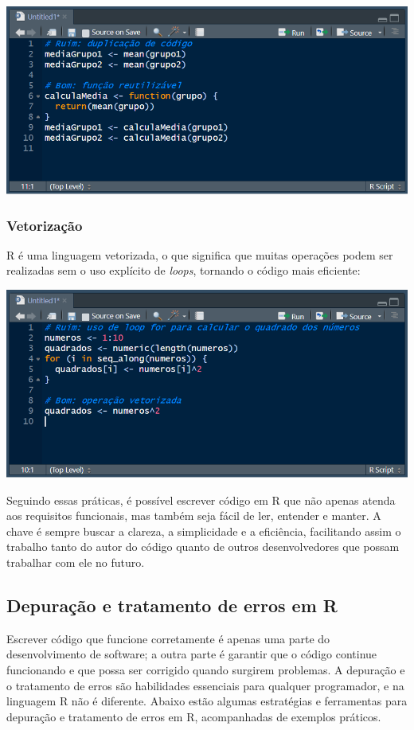 \documentclass[
]{book}
\begin{document}
\includegraphics{images/clipboard-491234479.png}

\subsubsection{Vetorização}\label{vetorizauxe7uxe3o}

R é uma linguagem vetorizada, o que significa que muitas operações podem ser realizadas sem o uso explícito de \emph{loops}, tornando o código mais eficiente:

\includegraphics{images/clipboard-2187533748.png}

Seguindo essas práticas, é possível escrever código em R que não apenas atenda aos requisitos funcionais, mas também seja fácil de ler, entender e manter. A chave é sempre buscar a clareza, a simplicidade e a eficiência, facilitando assim o trabalho tanto do autor do código quanto de outros desenvolvedores que possam trabalhar com ele no futuro.

\subsection{Depuração e tratamento de erros em R}\label{depurauxe7uxe3o-e-tratamento-de-erros-em-r}

Escrever código que funcione corretamente é apenas uma parte do desenvolvimento de software; a outra parte é garantir que o código continue funcionando e que possa ser corrigido quando surgirem problemas. A depuração e o tratamento de erros são habilidades essenciais para qualquer programador, e na linguagem R não é diferente. Abaixo estão algumas estratégias e ferramentas para depuração e tratamento de erros em R, acompanhadas de exemplos práticos.
\end{document}
